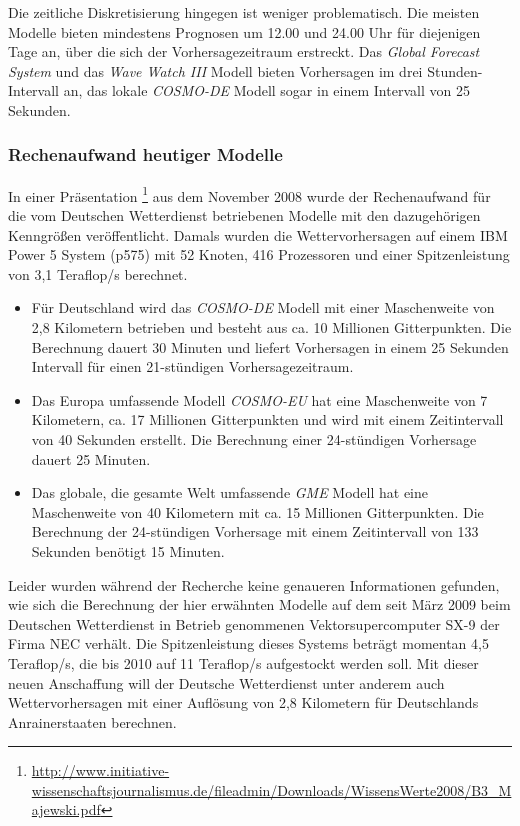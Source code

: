 Die zeitliche Diskretisierung hingegen ist weniger problematisch. Die
meisten Modelle bieten mindestens Prognosen um 12.00 und 24.00 Uhr für
diejenigen Tage an, über die sich der Vorhersagezeitraum
erstreckt. Das \textit{Global Forecast System} und das \textit{Wave
  Watch III} Modell bieten Vorhersagen im drei Stunden-Intervall an,
das lokale \textit{COSMO-DE} Modell sogar in einem Intervall von 25
Sekunden.

\subsubsection{Rechenaufwand heutiger Modelle}

In einer Präsentation
\footnote{\url{http://www.initiative-wissenschaftsjournalismus.de/fileadmin/Downloads/WissensWerte2008/B3_Majewski.pdf}}
aus dem November 2008 wurde der Rechenaufwand für die vom Deutschen
Wetterdienst betriebenen Modelle mit den dazugehörigen Kenngrößen
veröffentlicht. Damals wurden die Wettervorhersagen auf einem IBM
Power 5 System (p575) mit 52 Knoten, 416 Prozessoren und einer
Spitzenleistung von 3,1 Teraflop/s berechnet.

\begin{itemize}
\item Für Deutschland wird das \textit{COSMO-DE} Modell mit einer
  Maschenweite von 2,8 Kilometern betrieben und besteht aus ca. 10
  Millionen Gitterpunkten. Die Berechnung dauert 30 Minuten und
  liefert Vorhersagen in einem 25 Sekunden Intervall für einen
  21-stündigen Vorhersagezeitraum.
\item Das Europa umfassende Modell \textit{COSMO-EU} hat eine
  Maschenweite von 7 Kilometern, ca. 17 Millionen Gitterpunkten und
  wird mit einem Zeitintervall von 40 Sekunden erstellt. Die
  Berechnung einer 24-stündigen Vorhersage dauert 25 Minuten.
\item Das globale, die gesamte Welt umfassende \textit{GME} Modell hat
  eine Maschenweite von 40 Kilometern mit ca. 15 Millionen
  Gitterpunkten. Die Berechnung der 24-stündigen Vorhersage mit einem
  Zeitintervall von 133 Sekunden benötigt 15 Minuten.
\end{itemize}

Leider wurden während der Recherche keine genaueren Informationen
gefunden, wie sich die Berechnung der hier erwähnten Modelle auf dem
seit März 2009 beim Deutschen Wetterdienst in Betrieb genommenen
Vektorsupercomputer SX-9 der Firma NEC verhält. Die Spitzenleistung
dieses Systems beträgt momentan 4,5 Teraflop/s, die bis 2010 auf 11
Teraflop/s aufgestockt werden soll. Mit dieser neuen Anschaffung will
der Deutsche Wetterdienst unter anderem auch Wettervorhersagen mit
einer Auflösung von 2,8 Kilometern für Deutschlands Anrainerstaaten
berechnen.

